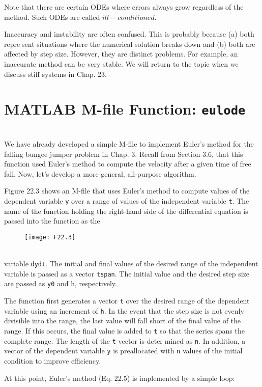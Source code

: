 Note that there are certain ODEs where errors always grow regardless of the method.
Such ODEs are called $ill-conditioned$.

Inaccuracy and instability are often confused. This is probably because (a) both represent situations where the numerical solution breaks down and (b) both are affected by step
size. However, they are distinct problems. For example, an inaccurate method can be very
stable. We will return to the topic when we discuss stiff systems in Chap. 23.

\section{MATLAB M-file Function: \texttt{eulode}}\\
We have already developed a simple M-file to implement Euler’s method for the falling
bungee jumper problem in Chap. 3. Recall from Section 3.6, that this function used Euler’s
method to compute the velocity after a given time of free fall. Now, let’s develop a more
general, all-purpose algorithm.

Figure 22.3 shows an M-file that uses Euler’s method to compute values of the dependent
variable \texttt{y} over a range of values of the independent variable \texttt{t}. The name of the function
holding the right-hand side of the differential equation is passed into the function as the\\
\begin{figure}[hbt!]
	\texttt{[image: F22.3]}
	\label{F22.3}
\end{figure}\\
variable \texttt{dydt}. The initial and final values of the desired range of the independent variable
is passed as a vector \texttt{tspan}. The initial value and the desired step size are passed as \texttt{y0} and
h, respectively.

The function first generates a vector \texttt{t} over the desired range of the dependent variable
using an increment of \texttt{h}. In the event that the step size is not evenly divisible into the range,
the last value will fall short of the final value of the range. If this occurs, the final value is
added to \texttt{t} so that the series spans the complete range. The length of the \texttt{t} vector is determined as \texttt{n}. In addition, a vector of the dependent variable \texttt{y} is preallocated with \texttt{n} values
of the initial condition to improve efficiency.

At this point, Euler’s method (Eq. 22.5) is implemented by a simple loop:

